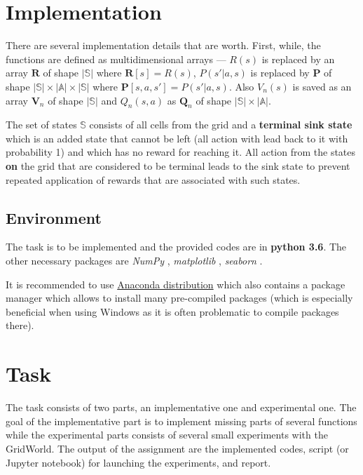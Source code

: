 \documentclass[10pt,journal,compsoc,twoside]{IEEEtran}
\newcommand{\matr}[1]{\mathbf{#1}} %
\begin{document}
\section{Implementation}
There are several implementation details that are worth. First, while, the functions are defined as multidimensional arrays --- $R(s)$ is replaced by an array $\matr{R}$ of shape $|\mathbb{S}|$ where $\matr{R}[s] = R(s)$, $P(s' | a, s)$ is replaced by $\matr{P}$ of shape $|\mathbb{S}| \times |\mathbb{A}| \times |\mathbb{S}|$ where $\matr{P}[s,a,s'] = P(s' | a, s)$. Also $V_n(s)$ is saved as an array $\matr{V}_n$ of shape $|\mathbb{S}|$  and $Q_n(s,a)$ as $\matr{Q}_n$ of shape $|\mathbb{S}| \times |\mathbb{A}|$.

The set of states $\mathbb{S}$ consists of all cells from the grid and a \textbf{terminal sink state} which is an added state that cannot be left (all action with lead back to it with probability 1) and which has no reward for reaching it. All action from the states \textbf{on} the grid that are considered to be terminal leads to the sink state to prevent repeated application of rewards that are associated with such states.

\subsection{Environment}
The task is to be implemented and the provided codes are in \textbf{python 3.6}. The other necessary packages are \textit{NumPy} \cite{numpy}, \textit{matplotlib} \cite{matplotlib}, \textit{seaborn} \cite{seaborn}.

It is recommended to use \href{https://www.anaconda.com/download/}{Anaconda distribution} which also contains a package manager which allows to install many pre-compiled packages (which is especially beneficial when using Windows as it is often problematic to compile packages there).

\section{Task}
The task consists of two parts, an implementative one and experimental one. The goal of the implementative part is to implement missing parts of several functions while the experimental parts consists of several small experiments with the GridWorld. The output of the assignment are the implemented codes, script (or Jupyter notebook) for launching the experiments, and report.
\end{document}

